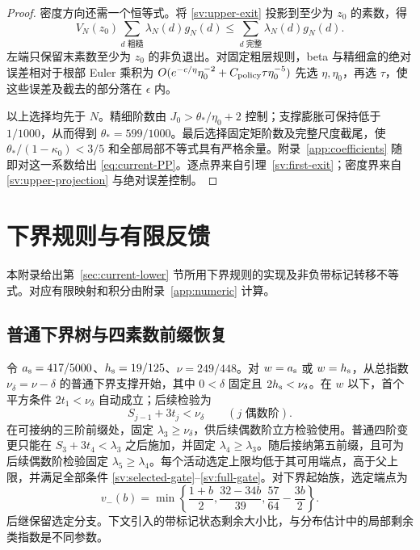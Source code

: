 \begin{proof}
密度方向还需一个恒等式。将 \eqref{sv:upper-exit} 投影到至少为 $z_0$ 的素数，得
\begin{equation}\label{sv:upper-projection}
 V_N(z_0)\sum_{d\text{ 粗糙}}\lambda_N(d)g_N(d)
       \le\sum_{d\text{ 完整}}\lambda_N(d)g_N(d).
\end{equation}
左端只保留末素数至少为 $z_0$ 的非负退出。对固定粗层规则，beta 与精细盒的绝对误差相对于根部 Euler 乘积为
$O(e^{-c/\eta}\eta_0^{-2}+C_{\rm policy}\tau\eta_0^{-5})$
先选 $\eta,\eta_0$，再选 $\tau$，使这些误差及截去的部分落在 $\epsilon$ 内。

以上选择均先于 $N$。精细阶数由 $J_0>\theta_*/\eta_0+2$ 控制；支撑膨胀可保持低于 $1/1000$，从而得到 $\theta_*=599/1000$。最后选择固定矩阶数及完整尺度截尾，使 $\theta_*/(1-\kappa_0)<3/5$ 和全部局部不等式具有严格余量。附录~\ref{app:coefficients} 随即对这一系数给出 \eqref{eq:current-PP}。逐点界来自引理~\ref{sv:first-exit}；密度界来自 \eqref{sv:upper-projection} 与绝对误差控制。
\end{proof}

\section{下界规则与有限反馈}\label{app:lower}

本附录给出第~\ref{sec:current-lower} 节所用下界规则的实现及非负带标记转移不等式。对应有限映射和积分由附录~\ref{app:numeric} 计算。

\subsection{普通下界树与四素数前缀恢复}

令 ${a_{\rm s}}=417/5000$、${h_{\rm s}}=19/125$、$\nu=249/448$。对 $w={a_{\rm s}}$ 或 $w={h_{\rm s}}$，从总指数 $\nu_\delta=\nu-\delta$ 的普通下界支撑开始，其中 $0<\delta$ 固定且 $2{h_{\rm s}}<\nu_\delta$。在 $w$ 以下，首个平方条件 $2t_1<\nu_\delta$ 自动成立；后续检验为
\begin{equation}\label{sv:lower-cubes}
 S_{j-1}+3t_j<\nu_\delta\qquad(j\text{ 偶数阶}).
\end{equation}
在可接纳的三阶前缀处，固定 $\lambda_3\ge\nu_\delta$，供后续偶数阶立方检验使用。普通四阶变更只能在 $S_3+3t_4<\lambda_3$ 之后施加，并固定 $\lambda_4\ge\lambda_3$。随后接纳第五前缀，且可为后续偶数阶检验固定 $\lambda_5\ge\lambda_4$。每个活动选定上限均低于其可用端点，高于父上限，并满足全部条件 \eqref{sv:selected-gate}--\eqref{sv:full-gate}。对下界起始族，选定端点为
\begin{equation}\label{sv:lower-endpoint}
 v_-(b)=\min\left\{\frac{1+b}{2},
 \frac{32-34b}{39},\frac{57}{64}-\frac{3b}{2}\right\}.
\end{equation}
后继保留选定分支。下文引入的带标记状态剩余大小比，与分布估计中的局部剩余类指数是不同参数。

